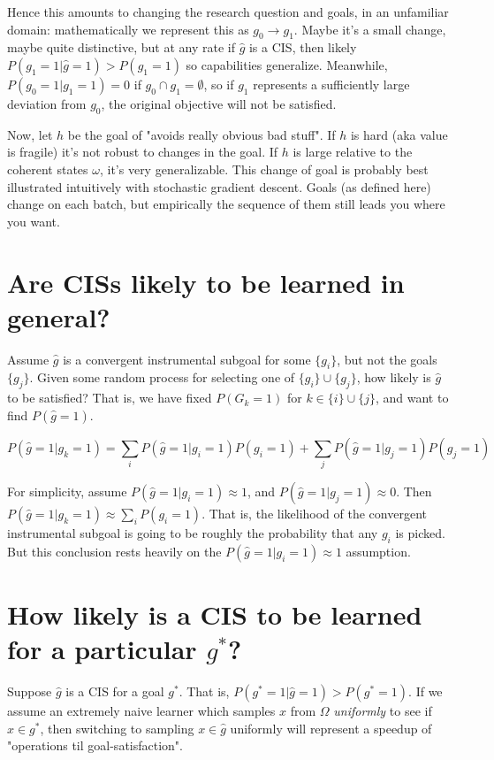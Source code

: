 \documentclass{article}
\begin{document}
Hence this amounts to changing the research question and goals, in an unfamiliar domain: mathematically we represent this as $g_0 \rightarrow g_1$. Maybe it's a small change, maybe quite distinctive, but at any rate if $\hat{g}$ is a CIS, then likely $P(g_1=1|\hat{g}=1)>P(g_1=1)$ so capabilities generalize. Meanwhile, $P(g_0=1|g_1=1)=0$ if $g_0 \cap g_1 = \emptyset$, so if $g_1$ represents a sufficiently large deviation from $g_0$, the original objective will not be satisfied.

Now, let $h$ be the goal of "avoids really obvious bad stuff". If $h$ is hard (aka value is fragile) it's not robust to changes in the goal. If $h$ is large relative to the coherent states $\omega$, it's very generalizable. This change of goal is probably best illustrated intuitively with stochastic gradient descent. Goals (as defined here) change on each batch, but empirically the sequence of them still leads you where you want.

\section{Are CISs likely to be learned in general?}
Assume $\hat{g}$ is a convergent instrumental subgoal for some $\{g_i\}$, but not the goals $\{g_j\}$. Given some random process for selecting one of $\{g_i\} \cup \{g_j\}$, how likely is $\hat{g}$ to be satisfied? That is, we have fixed $P(G_k=1)$ for $k \in \{i\} \cup \{j\}$, and want to find $P(\hat{g} =1)$.

\[
P(\hat{g}=1|g_k=1)=\sum_i P(\hat{g}=1|g_i=1)P(g_i=1) + \sum_j P(\hat{g}=1|g_j=1)P(g_j=1)
\]

For simplicity, assume $P(\hat{g}=1|g_i=1) \approx 1$, and $P(\hat{g}=1|g_j=1) \approx 0$. Then $P(\hat{g}=1|g_k=1) \approx \sum_i P(g_i=1)$. That is, the likelihood of the convergent instrumental subgoal is going to be roughly the probability that any $g_i$ is picked. But this conclusion rests heavily on the $P(\hat{g}=1|g_i=1) \approx 1$ assumption.

\section{How likely is a CIS to be learned for a particular $g^*$?}
Suppose $\hat{g}$ is a CIS for a goal $g^*$. That is, $P(g^*=1|\hat{g}=1)>P(g^*=1)$. If we assume an extremely naive learner which samples $x$ from $\Omega$ \textit{uniformly} to see if $x \in g^*$, then switching to sampling $x \in \hat{g}$ uniformly will represent a speedup of "operations til goal-satisfaction".
\end{document}

